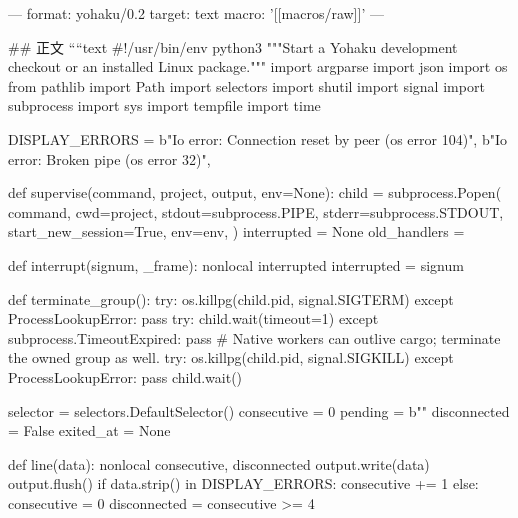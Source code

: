---
format: yohaku/0.2
target: text
macro: '[[macros/raw]]'
---

## 正文
````text
#!/usr/bin/env python3
"""Start a Yohaku development checkout or an installed Linux package."""
import argparse
import json
import os
from pathlib import Path
import selectors
import shutil
import signal
import subprocess
import sys
import tempfile
import time

DISPLAY_ERRORS = {
    b"Io error: Connection reset by peer (os error 104)",
    b"Io error: Broken pipe (os error 32)",
}


def supervise(command, project, output, env=None):
    child = subprocess.Popen(
        command, cwd=project, stdout=subprocess.PIPE,
        stderr=subprocess.STDOUT, start_new_session=True, env=env,
    )
    interrupted = None
    old_handlers = {}

    def interrupt(signum, _frame):
        nonlocal interrupted
        interrupted = signum

    def terminate_group():
        try:
            os.killpg(child.pid, signal.SIGTERM)
        except ProcessLookupError:
            pass
        try:
            child.wait(timeout=1)
        except subprocess.TimeoutExpired:
            pass
        # Native workers can outlive cargo; terminate the owned group as well.
        try:
            os.killpg(child.pid, signal.SIGKILL)
        except ProcessLookupError:
            pass
        child.wait()

    selector = selectors.DefaultSelector()
    consecutive = 0
    pending = b""
    disconnected = False
    exited_at = None

    def line(data):
        nonlocal consecutive, disconnected
        output.write(data)
        output.flush()
        if data.strip() in DISPLAY_ERRORS:
            consecutive += 1
        else:
            consecutive = 0
        disconnected = consecutive >= 4

